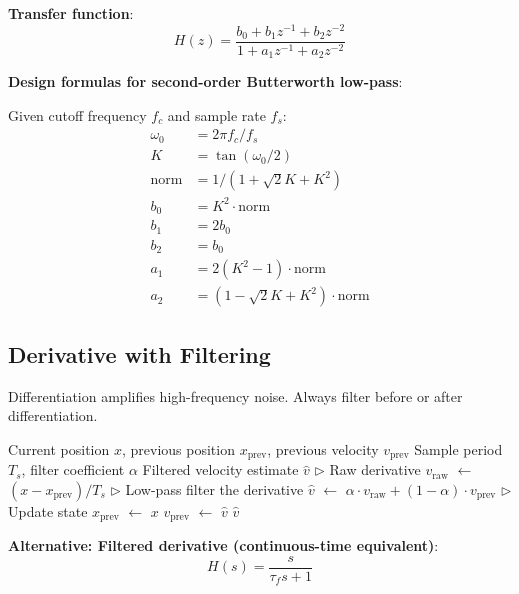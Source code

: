 \textbf{Transfer function}:
\begin{equation}
H(z) = \frac{b_0 + b_1 z^{-1} + b_2 z^{-2}}{1 + a_1 z^{-1} + a_2 z^{-2}}
\label{eq:biquad_tf}
\end{equation}

\textbf{Design formulas for second-order Butterworth low-pass}:

Given cutoff frequency $f_c$ and sample rate $f_s$:
\begin{align}
\omega_0 &= 2\pi f_c / f_s \\
K &= \tan(\omega_0 / 2) \\
\text{norm} &= 1 / (1 + \sqrt{2} K + K^2) \\
b_0 &= K^2 \cdot \text{norm} \\
b_1 &= 2 b_0 \\
b_2 &= b_0 \\
a_1 &= 2(K^2 - 1) \cdot \text{norm} \\
a_2 &= (1 - \sqrt{2} K + K^2) \cdot \text{norm}
\end{align}

\subsection{Derivative with Filtering}

Differentiation amplifies high-frequency noise. Always filter before or after differentiation.

\begin{algorithm}[htbp]
\caption{Filtered Derivative (Velocity from Position)}
\label{alg:filtered_derivative}
\begin{algorithmic}
\REQUIRE Current position $x$, previous position $x_{\text{prev}}$, previous velocity $v_{\text{prev}}$
\REQUIRE Sample period $T_s$, filter coefficient $\alpha$
\ENSURE Filtered velocity estimate $\hat{v}$
\STATE $\triangleright$ Raw derivative
\STATE $v_{\text{raw}}$ $\leftarrow$ $(x - x_{\text{prev}}) / T_s$
\STATE $\triangleright$ Low-pass filter the derivative
\STATE $\hat{v}$ $\leftarrow$ $\alpha \cdot v_{\text{raw}} + (1 - \alpha) \cdot v_{\text{prev}}$
\STATE $\triangleright$ Update state
\STATE $x_{\text{prev}}$ $\leftarrow$ $x$
\STATE $v_{\text{prev}}$ $\leftarrow$ $\hat{v}$
\RETURN $\hat{v}$
\end{algorithmic}
\end{algorithm}

\textbf{Alternative: Filtered derivative (continuous-time equivalent)}:
\begin{equation}
H(s) = \frac{s}{\tau_f s + 1}
\label{eq:filtered_derivative}
\end{equation}

